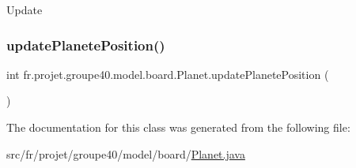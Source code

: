 Update \mbox{\label{classfr_1_1projet_1_1groupe40_1_1model_1_1board_1_1_planet_a6964d033e72c629b179e917e0e0af896}} 
\subsubsection{\texorpdfstring{update\+Planete\+Position()}{updatePlanetePosition()}}
{\footnotesize\ttfamily int fr.\+projet.\+groupe40.\+model.\+board.\+Planet.\+update\+Planete\+Position (\begin{DoxyParamCaption}{ }\end{DoxyParamCaption})}



The documentation for this class was generated from the following file\+:\begin{DoxyCompactItemize}
\item 
src/fr/projet/groupe40/model/board/\hyperlink{_planet_8java}{Planet.\+java}\end{DoxyCompactItemize}
